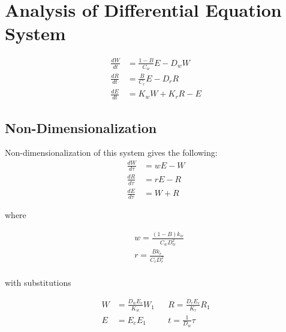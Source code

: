\documentclass[12pt]{report}
\begin{document}
\section*{Analysis of Differential Equation System}

\begin{equation}
\begin{aligned}
\frac{dW}{dt}&=\frac{1-B}{C_w}E-D_w W\\
\frac{dR}{dt}&=\frac{B}{C_r}E-D_r R\\
\frac{dE}{dt}&=K_w W + K_r R - E
\end{aligned}
\label{eq: system}
\end{equation}


\subsection*{Non-Dimensionalization}

Non-dimensionalization of this system gives the following:
\begin{equation}
\begin{aligned}
\frac{dW}{d\tau}&=w E-W \\
\frac{dR}{d\tau}&=r E-R \\
\frac{dE}{d\tau}&=  W+R
\end{aligned}
\label{eq: nondim}
\end{equation}

where

\begin{equation}
\begin{aligned}
&w=\frac{(1-B) k_w}{C_w D_w^2}\\
&r=\frac{B k_r}{C_r D_r^2}\\
\end{aligned}
\label{eq: nondim wr}
\end{equation}

with substitutions

\begin{equation}
\begin{aligned}
W &= \frac{D_w E_{c}}{K_w}W_1
&&R = \frac{D_r E_{c}}{K_r}R_1\\
E &= E_c E_1  &&t = \frac{1}{D_w}\tau
\end{aligned}
\label{eq: subs}
\end{equation}
\end{document}
